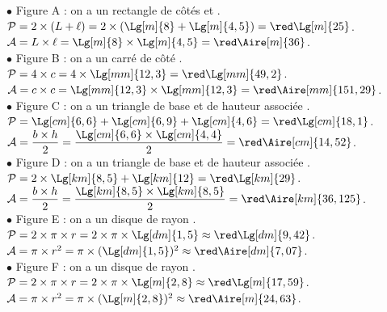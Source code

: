 \begin{corrige}
   \textcolor{G1}{$\bullet$} Figure A : on a un rectangle de côtés  et . \\
      $\mathcal{P} =2\times(L+\ell) =2\times(\Lg[m]{8}+\Lg[m]{4,5}) =\red\Lg[m]{25}$. \\
      $\mathcal{A} =L\times\ell =\Lg[m]{8}\times\Lg[m]{4,5} =\red\Aire[m]{36}$. \\
   \textcolor{G1}{$\bullet$} Figure B : on a un carré de côté . \\
      $\mathcal{P} =4\times c =4\times\Lg[mm]{12,3} =\red\Lg[mm]{49,2}$. \\ 
      $\mathcal{A} =c\times c =\Lg[mm]{12,3}\times\Lg[mm]{12,3} =\red\Aire[mm]{151,29}$. \\ 
   \textcolor{G1}{$\bullet$} Figure C : on a un triangle de base  et de hauteur associée . \\
      $\mathcal{P} =\Lg[cm]{6,6}+\Lg[cm]{6,9}+\Lg[cm]{4,6} =\red \Lg[cm]{18,1}$. \\ [1mm]
      $\mathcal{A} =\dfrac{b\times h}{2} =\dfrac{\Lg[cm]{6,6}\times\Lg[cm]{4,4}}{2}=\red \Aire[cm]{14,52}$. \\ [1mm]
   \textcolor{G1}{$\bullet$} Figure D : on a un triangle de base  et de hauteur associée . \\
      $\mathcal{P} =2\times\Lg[km]{8,5}+\Lg[km]{12} =\red \Lg[km]{29}$. \\ [1mm]
      $\mathcal{A} =\dfrac{b\times h}{2}  =\dfrac{\Lg[km]{8,5}\times\Lg[km]{8,5}}{2}=\red \Aire[km]{36,125}$. \\ [1mm]
   \textcolor{G1}{$\bullet$}  Figure E : on a un disque de rayon . \\
      $\mathcal{P} =2\times\pi\times r =2\times\pi\times\Lg[dm]{1,5} \approx\red \Lg[dm]{9,42}$. \\
      $\mathcal{A} =\pi\times r^2 =\pi\times(\Lg[dm]{1,5})^2 \approx\red \Aire[dm]{7,07}$. \\
   \textcolor{G1}{$\bullet$}  Figure F : on a un disque de rayon . \\
      $\mathcal{P} =2\times\pi\times r =2\times\pi\times\Lg[m]{2,8} \approx\red \Lg[m]{17,59}$. \\
      $\mathcal{A} =\pi\times r^2 =\pi\times(\Lg[m]{2,8})^2 \approx\red \Aire[m]{24,63}$. \\       
\end{corrige}
